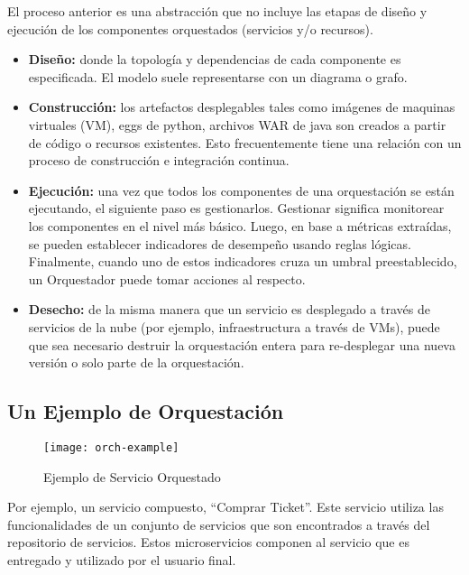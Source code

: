 	    El proceso anterior es una abstracción que no incluye las etapas de diseño y ejecución de los componentes orquestados (servicios y/o recursos).
        
        \begin{itemize} 
        \item \textbf{Diseño: }donde la topología y dependencias de cada componente es especificada. El modelo suele representarse con un diagrama o grafo.
        
        \item \textbf{Construcción: }los artefactos desplegables tales como imágenes de maquinas virtuales (VM), eggs de python, archivos WAR de java son creados a partir de código o recursos existentes. Esto frecuentemente tiene una relación con un proceso de construcción e integración continua.
        
        \item \textbf{Ejecución: }una vez que todos los componentes de una orquestación se están ejecutando, el siguiente paso es gestionarlos. Gestionar significa monitorear los componentes en el nivel más básico. Luego, en base a métricas extraídas, se pueden establecer indicadores de desempeño usando reglas lógicas. Finalmente, cuando uno de estos indicadores cruza un umbral preestablecido, un Orquestador puede tomar acciones al respecto.
        
        \item \textbf{Desecho: }de la misma manera que un servicio es desplegado a través de servicios de la nube (por ejemplo, infraestructura a través de VMs), puede que sea necesario destruir la orquestación entera para re-desplegar una nueva versión o solo parte de la orquestación. 
        \end{itemize}

        \subsection{Un Ejemplo de Orquestación}
        \begin{figure}[H]
            \centering
            \texttt{[image: orch-example]}
            \caption{Ejemplo de Servicio Orquestado}
            \label{fig:orch-example}
        \end{figure}
        Por ejemplo, un servicio compuesto, “Comprar Ticket”. Este servicio utiliza las funcionalidades de un conjunto de servicios que son encontrados a través del repositorio de servicios. Estos microservicios componen al servicio que es entregado y utilizado por el usuario final. 
        
